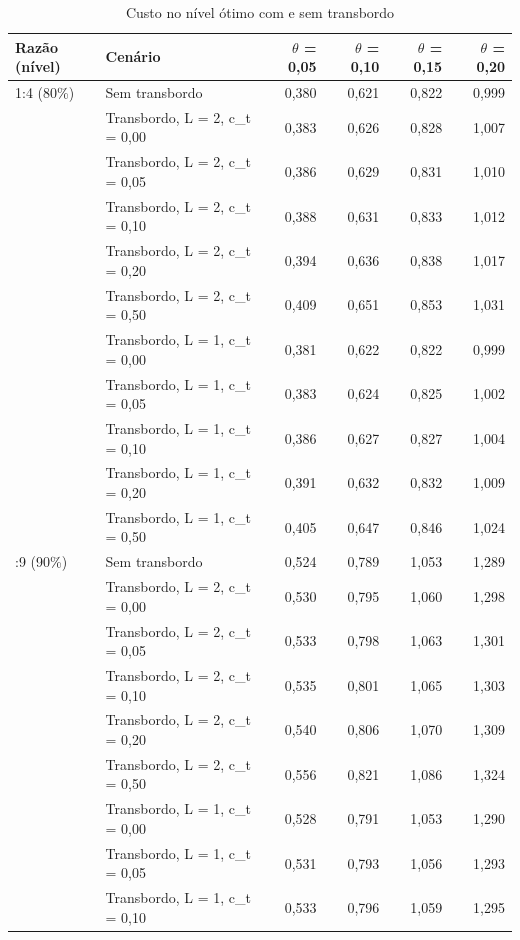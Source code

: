 \begin{table}[htbp]
\centering
\small
\caption{Custo no nível ótimo com e sem transbordo}
\label{tab:tb_custo_otimo}
\begin{tabular}{llrrrr}
\toprule
Razão (nível) & Cenário & $\theta$ = 0,05 & $\theta$ = 0,10 & $\theta$ = 0,15 & $\theta$ = 0,20 \\
\midrule
1:4 (80\%) & Sem transbordo & 0,380 & 0,621 & 0,822 & 0,999 \\
 & Transbordo, L = 2, c\_t = 0,00 & 0,383 & 0,626 & 0,828 & 1,007 \\
 & Transbordo, L = 2, c\_t = 0,05 & 0,386 & 0,629 & 0,831 & 1,010 \\
 & Transbordo, L = 2, c\_t = 0,10 & 0,388 & 0,631 & 0,833 & 1,012 \\
 & Transbordo, L = 2, c\_t = 0,20 & 0,394 & 0,636 & 0,838 & 1,017 \\
 & Transbordo, L = 2, c\_t = 0,50 & 0,409 & 0,651 & 0,853 & 1,031 \\
 & Transbordo, L = 1, c\_t = 0,00 & 0,381 & 0,622 & 0,822 & 0,999 \\
 & Transbordo, L = 1, c\_t = 0,05 & 0,383 & 0,624 & 0,825 & 1,002 \\
 & Transbordo, L = 1, c\_t = 0,10 & 0,386 & 0,627 & 0,827 & 1,004 \\
 & Transbordo, L = 1, c\_t = 0,20 & 0,391 & 0,632 & 0,832 & 1,009 \\
 & Transbordo, L = 1, c\_t = 0,50 & 0,405 & 0,647 & 0,846 & 1,024 \\
\addlinespace
1:9 (90\%) & Sem transbordo & 0,524 & 0,789 & 1,053 & 1,289 \\
 & Transbordo, L = 2, c\_t = 0,00 & 0,530 & 0,795 & 1,060 & 1,298 \\
 & Transbordo, L = 2, c\_t = 0,05 & 0,533 & 0,798 & 1,063 & 1,301 \\
 & Transbordo, L = 2, c\_t = 0,10 & 0,535 & 0,801 & 1,065 & 1,303 \\
 & Transbordo, L = 2, c\_t = 0,20 & 0,540 & 0,806 & 1,070 & 1,309 \\
 & Transbordo, L = 2, c\_t = 0,50 & 0,556 & 0,821 & 1,086 & 1,324 \\
 & Transbordo, L = 1, c\_t = 0,00 & 0,528 & 0,791 & 1,053 & 1,290 \\
 & Transbordo, L = 1, c\_t = 0,05 & 0,531 & 0,793 & 1,056 & 1,293 \\
 & Transbordo, L = 1, c\_t = 0,10 & 0,533 & 0,796 & 1,059 & 1,295 \\

\end{tabular}
\end{table}
